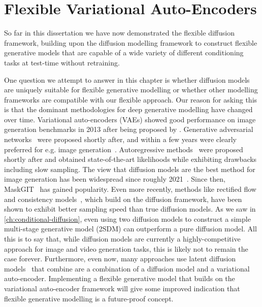 \chapter{Flexible Variational Auto-Encoders}
\label{ch:cigcvae}

So far in this dissertation we have now demonstrated the flexible diffusion framework, building upon the diffusion modelling framework to construct flexible generative models that are capable of a wide variety of different conditioning tasks at test-time without retraining.

One question we attempt to answer in this chapter is whether diffusion models are uniquely suitable for flexible generative modelling or whether other modelling frameworks are compatible with our flexible approach. Our reason for asking this is that the dominant methodologies for deep generative modelling have changed over time. Variational auto-encoders (VAEs) showed good performance on image generation benchmarks in 2013 after being proposed by \citet{kingma2013auto}. Generative adversarial networks~\citep{goodfellow2014generative} were proposed shortly after, and within a few years were clearly preferred for e.g. image generation~\citep{karras2018style}. Autoregressive methods~\citep{van2016pixel} were proposed shortly after and obtained state-of-the-art likelihoods while exhibiting drawbacks including slow sampling. The view that diffusion models are the best method for image generation has been widespread since roughly 2021~\citep{dhariwal2021diffusion}. Since then, MaskGIT~\citep{chang2022maskgit} has gained popularity. Even more recently, methods like rectified flow~\citep{esser2024scaling} and consistency models~\citep{song2023consistency}, which build on the diffusion framework, have been shown to exhibit better sampling speed than true diffusion models. As we saw in \cref{ch:conditional-diffusion}, even using two diffusion models to construct a simple multi-stage generative model (2SDM) can outperform a pure diffusion model. All this is to say that, while diffusion models are currently a highly-competitive approach for image and video generation tasks, this is likely not to remain the case forever. Furthermore, even now, many approaches use latent diffusion models~\citep{rombach2022high} that combine are a combination of a diffusion model and a variational auto-encoder. Implementing a flexible generative model that builds on the variational auto-encoder framework will give some improved indication that flexible generative modelling is a future-proof concept.

